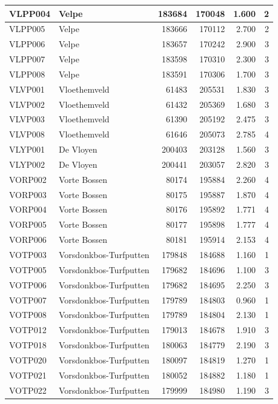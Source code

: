\documentclass[11pt,]{book}
\begin{document}
\begin{table}
\begin{tabular}[t]{l|l|r|r|r|r}
\hline
VLPP004 & Velpe & 183684 & 170048 & 1.600 & 2\\
\hline
VLPP005 & Velpe & 183666 & 170112 & 2.700 & 2\\
\hline
VLPP006 & Velpe & 183657 & 170242 & 2.900 & 3\\
\hline
VLPP007 & Velpe & 183598 & 170310 & 2.300 & 3\\
\hline
VLPP008 & Velpe & 183591 & 170306 & 1.700 & 3\\
\hline
VLVP001 & Vloethemveld & 61483 & 205531 & 1.830 & 3\\
\hline
VLVP002 & Vloethemveld & 61432 & 205369 & 1.680 & 3\\
\hline
VLVP003 & Vloethemveld & 61390 & 205192 & 2.475 & 3\\
\hline
VLVP008 & Vloethemveld & 61646 & 205073 & 2.785 & 4\\
\hline
VLYP001 & De Vloyen & 200403 & 203128 & 1.560 & 3\\
\hline
VLYP002 & De Vloyen & 200441 & 203057 & 2.820 & 3\\
\hline
VORP002 & Vorte Bossen & 80174 & 195884 & 2.260 & 4\\
\hline
VORP003 & Vorte Bossen & 80175 & 195887 & 1.870 & 4\\
\hline
VORP004 & Vorte Bossen & 80176 & 195892 & 1.771 & 4\\
\hline
VORP005 & Vorte Bossen & 80177 & 195898 & 1.777 & 4\\
\hline
VORP006 & Vorte Bossen & 80181 & 195914 & 2.153 & 4\\
\hline
VOTP003 & Vorsdonkbos-Turfputten & 179848 & 184688 & 1.160 & 1\\
\hline
VOTP005 & Vorsdonkbos-Turfputten & 179682 & 184696 & 1.100 & 3\\
\hline
VOTP006 & Vorsdonkbos-Turfputten & 179682 & 184695 & 2.250 & 3\\
\hline
VOTP007 & Vorsdonkbos-Turfputten & 179789 & 184803 & 0.960 & 1\\
\hline
VOTP008 & Vorsdonkbos-Turfputten & 179789 & 184804 & 2.130 & 1\\
\hline
VOTP012 & Vorsdonkbos-Turfputten & 179013 & 184678 & 1.910 & 3\\
\hline
VOTP018 & Vorsdonkbos-Turfputten & 180063 & 184779 & 2.190 & 3\\
\hline
VOTP020 & Vorsdonkbos-Turfputten & 180097 & 184819 & 1.270 & 1\\
\hline
VOTP021 & Vorsdonkbos-Turfputten & 180052 & 184882 & 1.180 & 1\\
\hline
VOTP022 & Vorsdonkbos-Turfputten & 179999 & 184980 & 1.190 & 3\\

\end{tabular}
\end{table}
\end{document}
